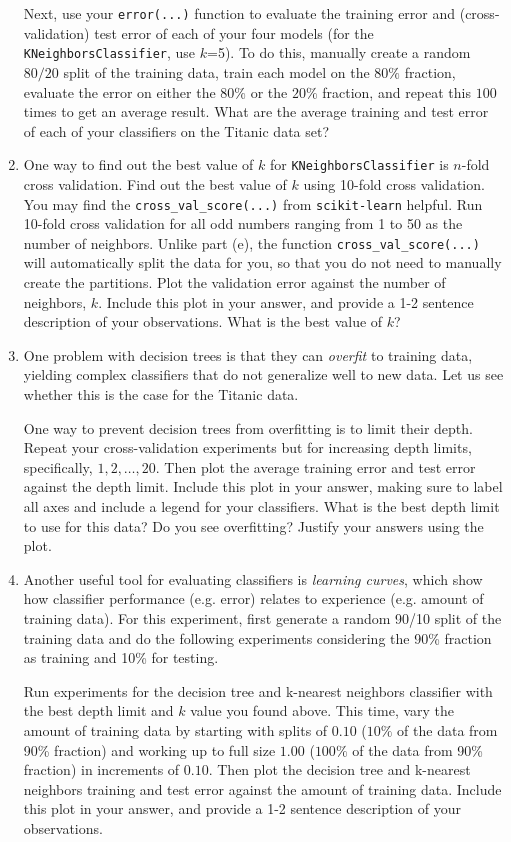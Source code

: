 \begin{enumerate}[resume]
Next, use your \verb|error(...)| function to evaluate the training error and (cross-validation) test error of each of your four models (for the \verb|KNeighborsClassifier|, use $k$=5). To do this, manually create a random $80/20$ split of the training data, train each model on the $80\%$ fraction, evaluate the error on either the $80\%$ or the $20\%$ fraction, and repeat this $100$ times to get an average result. What are the average training and test error of each of your classifiers on the Titanic data set?


\item {} One way to find out the best value of $k$ for \verb|KNeighborsClassifier| is $n$-fold cross validation.
Find out the best value of $k$ using 10-fold cross validation. You may find the \verb|cross_val_score(...)| from \verb|scikit-learn| helpful. Run 10-fold cross validation for all odd numbers ranging from 1 to 50 as the number of neighbors. Unlike part (e), the function \verb|cross_val_score(...)| will automatically split the data for you, so that you do not need to manually create the partitions. 
Plot the validation error against the number of neighbors, $k$.
Include this plot in your answer, and provide a 1-2 sentence description of your observations. What is the best value of $k$?


\item {} One problem with decision trees is that they can \emph{overfit} to training data, yielding complex classifiers that do not generalize well to new data. Let us see whether this is the case for the Titanic data.

One way to prevent decision trees from overfitting is to limit their depth. Repeat your cross-validation experiments but for increasing depth limits, specifically, $1,2,\ldots,20$. Then plot the average training error and test error against the depth limit. 
Include this plot in your answer, making sure to label all axes and include a legend for your classifiers. What is the best depth limit to use for this data? Do you see overfitting? Justify your answers using the plot.

\item {} Another useful tool for evaluating classifiers is \emph{learning curves}, which show how classifier performance (e.g. error) relates to experience (e.g. amount of training data).
For this experiment, first generate a random 90/10 split of the training data and do the following experiments considering the 90\% fraction as training and 10\% for testing. 

Run experiments for the decision tree and k-nearest neighbors classifier with the best depth limit and $k$ value you found above.
This time, vary the amount of training data by starting with splits of $0.10$ ($10\%$ of the data from 90\% fraction) and working up to full size $1.00$ ($100\%$ of the data from 90\% fraction) in increments of $0.10$. Then plot the decision tree and k-nearest neighbors training and test error against the amount of training data. 
Include this plot in your answer, and provide a 1-2 sentence description of your observations.


\end{enumerate}
